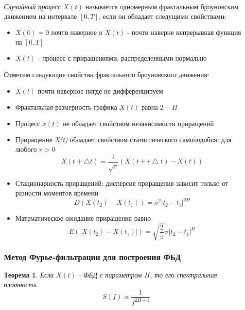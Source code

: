 \textit{Случайный процесс}  $X(t)$ называется одномерным фрактальным броуновским движением на интервале $[0, T]$, если он обладает следущими свойствами:

\begin{itemize}
	\item $X(0) = 0$ почти наверное и $X(t)$ - почти наверне непрерывная функция на $[0, T]$
	\item  $X(t)$ - процесс с приращениями, распределенными нормально
\end{itemize}

Отметим следующие свойства фрактального броуновского движения:

\begin{itemize}
	\item $X(t)$ почти наверное нигде не дифференцируем 
	\item Фрактальная размерность графика $X(t)$ равна $2 - H$
	\item Процесс $x(t)$ не обладает свойством независимости приращений
	\item Приращение \textit{X(t)} обладает свойством статистического самоподобия: для любого $r$ > 0
	\begin{equation}
		X(t+ \bigtriangleup t) = \frac{1}{\sqrt{r}}(X(t+r\bigtriangleup t) - X(t))
	\end{equation}
	\item Стационарность приращений: дисперсия приращения зависит только от разности моментов времени
	\begin{equation} \label{1.6}
		D(X(t_2) - X(t_1)) = \sigma^2|t_2-t_1|^{2H}
	\end{equation}
	\item Математическое ожидание приращения равно
	\begin{equation}
		E(|X(t_2) - X(t_1)|) = \sqrt{\frac{2}{\pi}}\sigma|t_2-t_1|^H
	\end{equation}
\end{itemize}

\subsubsection{Метод Фурье-фильтрации для построения ФБД}

\newtheorem{theorem1}{Теорема}
\begin{theorem1}
	Если $X(t)$ - ФБД с параметром $H$, то его спектральная плотность 
	\begin{equation}
		S(f) \propto \frac{1}{f^{2H+1}}
	\end{equation}
\end{theorem1}

